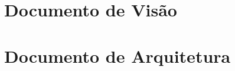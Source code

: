 \begin{anexosenv}
\partanexos
\chapter{Documento de Visão} \label{doc:visao}


\chapter{Documento de Arquitetura} \label{doc:arq}



\end{anexosenv}
